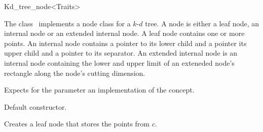 

\begin{ccRefClass}{Kd_tree_node<Traits>}  %


\ccDefinition
  
The class \ccRefName\ implements a node class for a $k$-$d$ tree. 
A node is either a leaf node, an internal node or an extended internal node.
A leaf node contains one or more points. An internal node contains a pointer
to its lower child and a pointer its upper child and a pointer to its separator.
An extended internal node is an internal node containing the lower and 
upper limit of an exteneded node's rectangle
along the node's cutting dimension.



Expects for the parameter  an implementation
of the 
concept.

\ccTypes



\ccCreation
{}  %

 {Default constructor.}

{
Creates a leaf node  that stores the points from $c$.
}


\end{ccRefClass}

